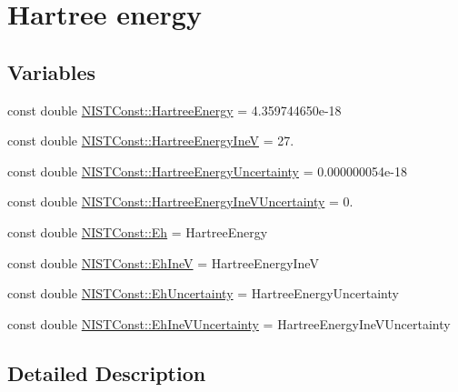 \hypertarget{group___n_i_s_t_const-_hartree_energy}{}\section{Hartree energy}
\label{group___n_i_s_t_const-_hartree_energy}
\subsection*{Variables}
\begin{DoxyCompactItemize}
\item 
const double \hyperlink{group___n_i_s_t_const-_hartree_energy_gab58dc1c4e59e83d4fb1217778fe9f29b}{N\+I\+S\+T\+Const\+::\+Hartree\+Energy} = 4.\+359744650e-\/18
\item 
const double \hyperlink{group___n_i_s_t_const-_hartree_energy_ga400eb5b8c9b55b0f601870ba54120364}{N\+I\+S\+T\+Const\+::\+Hartree\+Energy\+IneV} = 27.
\item 
const double \hyperlink{group___n_i_s_t_const-_hartree_energy_gaabdf38a4c491ca0f606bf042c8479801}{N\+I\+S\+T\+Const\+::\+Hartree\+Energy\+Uncertainty} = 0.\+000000054e-\/18
\item 
const double \hyperlink{group___n_i_s_t_const-_hartree_energy_gaa6e7ae83f510023bdd88d80dae80f97d}{N\+I\+S\+T\+Const\+::\+Hartree\+Energy\+Ine\+V\+Uncertainty} = 0.
\item 
const double \hyperlink{group___n_i_s_t_const-_hartree_energy_ga1955ca3dc0e0714b0caa7304e7389140}{N\+I\+S\+T\+Const\+::\+Eh} = Hartree\+Energy
\item 
const double \hyperlink{group___n_i_s_t_const-_hartree_energy_ga45991f1895507078b66f94f85e2e8af5}{N\+I\+S\+T\+Const\+::\+Eh\+IneV} = Hartree\+Energy\+IneV
\item 
const double \hyperlink{group___n_i_s_t_const-_hartree_energy_ga52137cfba941de2bd3b1b584bd1f31ee}{N\+I\+S\+T\+Const\+::\+Eh\+Uncertainty} = Hartree\+Energy\+Uncertainty
\item 
const double \hyperlink{group___n_i_s_t_const-_hartree_energy_ga44de589dbe84c79573b441fa366d320d}{N\+I\+S\+T\+Const\+::\+Eh\+Ine\+V\+Uncertainty} = Hartree\+Energy\+Ine\+V\+Uncertainty
\end{DoxyCompactItemize}


\subsection{Detailed Description}


